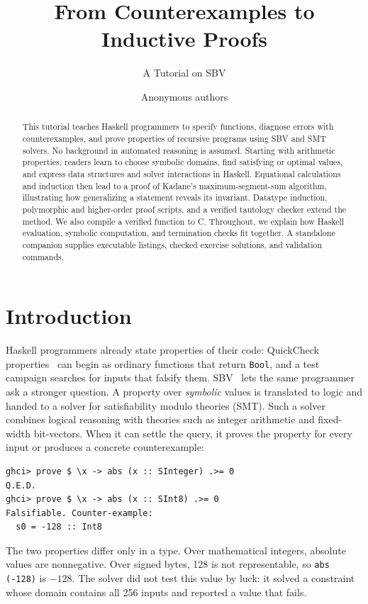 \documentclass[acmsmall,screen,review,anonymous,nonacm]{acmart}
\title{From Counterexamples to Inductive Proofs}
\subtitle{A Tutorial on SBV}
\author{Anonymous authors}
\newcommand{\code}[1]{\texttt{#1}}
\newcounter{exercise}
\begin{document}
\raggedbottom
\begin{abstract}
This tutorial teaches Haskell programmers to specify functions, diagnose errors
with counterexamples, and prove properties of recursive programs using SBV and
SMT solvers. No background in automated reasoning is assumed. Starting with
arithmetic properties, readers learn to choose symbolic domains, find satisfying
or optimal values, and express data structures and solver interactions in Haskell.
Equational calculations and induction then lead to a proof of Kadane's
maximum-segment-sum algorithm, illustrating how generalizing a statement reveals
its invariant. Datatype induction, polymorphic and higher-order proof scripts,
and a verified tautology checker extend the method. We also compile a verified
function to C. Throughout, we explain how
Haskell evaluation, symbolic computation, and termination checks fit together.
A standalone companion supplies executable listings, checked exercise solutions,
and validation commands.
\end{abstract}

\maketitle

\section{Introduction}
\label{sec:introduction}

Haskell programmers already state properties of their code: QuickCheck
properties~\citep{quickcheck} can begin as ordinary functions that return \code{Bool},
and a test campaign searches for inputs that falsify them. SBV~\citep{sbv} lets
the same programmer ask a stronger question. A property over \emph{symbolic}
values is translated to logic and handed to a solver for satisfiability modulo
theories (SMT). Such a solver combines logical reasoning with theories such as
integer arithmetic and fixed-width bit-vectors. When it can settle the query,
it proves the property for every input or produces a concrete counterexample:
\begin{lstlisting}
ghci> prove $ \x -> abs (x :: SInteger) .>= 0
Q.E.D.
ghci> prove $ \x -> abs (x :: SInt8) .>= 0
Falsifiable. Counter-example:
  s0 = -128 :: Int8
\end{lstlisting}
The two properties differ only in a type. Over mathematical integers, absolute
values are nonnegative. Over signed bytes, 128 is not representable, so
\code{abs (-128)} is $-128$. The solver did not test this value by luck: it
solved a constraint whose domain contains all 256 inputs and reported a value
that fails.
\end{document}
